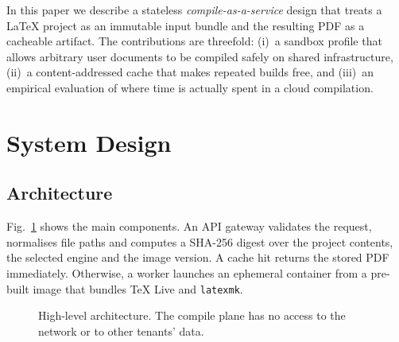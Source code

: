 \documentclass[conference]{IEEEtran}
\begin{document}
In this paper we describe a stateless \emph{compile-as-a-service} design that
treats a \LaTeX{} project as an immutable input bundle and the resulting PDF
as a cacheable artifact. The contributions are threefold: (i)~a sandbox
profile that allows arbitrary user documents to be compiled safely on shared
infrastructure, (ii)~a content-addressed cache that makes repeated builds
free, and (iii)~an empirical evaluation of where time is actually spent in a
cloud compilation.

\section{System Design}
\subsection{Architecture}
Fig.~\ref{fig:arch} shows the main components. An API gateway validates the
request, normalises file paths and computes a SHA-256 digest over the project
contents, the selected engine and the image version. A cache hit returns the
stored PDF immediately. Otherwise, a worker launches an ephemeral container
from a pre-built image that bundles \TeX{} Live and \texttt{latexmk}.

\begin{figure}[t]
  \centering
  \caption{High-level architecture. The compile plane has no access to the
    network or to other tenants' data.}
  \label{fig:arch}
\end{figure}
\end{document}
